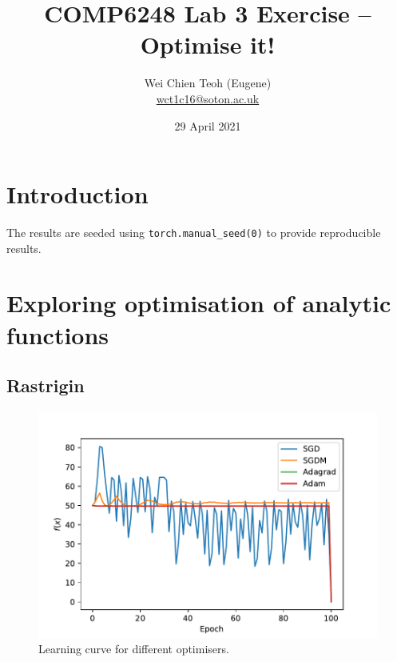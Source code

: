 \documentclass[twocolumn]{article}
\title{\Large COMP6248 Lab 3 Exercise -- Optimise it!}
\author{\small Wei Chien Teoh (Eugene)\\\bigskip \href{mailto:wct1c16@soton.ac.uk}{wct1c16@soton.ac.uk}}
\date{\small 29 April 2021}
\begin{document}
\maketitle

\section*{Introduction}

The results are seeded using \lstinline{torch.manual_seed(0)} to provide reproducible results.

\section{Exploring optimisation of analytic functions}

\subsection{Rastrigin}

\begin{figure}
    \centering
    \includegraphics[width=\linewidth]{Figures/learning_curve.pdf}
    \caption{Learning curve for different optimisers.}
    \label{fig:learning-curve}
\end{figure}
\end{document}
